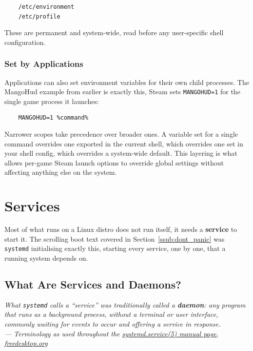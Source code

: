 \documentclass{article}
\newcommand{\code}[1]{\colorbox{codebg}{\texttt{#1}}}
\begin{document}
\begin{verbatim}
	/etc/environment
	/etc/profile
\end{verbatim}

\noindent These are permanent and system-wide, read before any user-specific shell configuration.

\subsubsection{Set by Applications}

Applications can also set environment variables for their own child processes.
The MangoHud example from earlier is exactly this, Steam sets
\code{MANGOHUD=1} for the single game process it launches:

\begin{verbatim}
	MANGOHUD=1 %command%
\end{verbatim}

\begin{tcolorbox}[arc=12pt, outer arc=10pt,
	colback=blue!4!white, colframe=blue!40!black,
	title=\textbf{Scope Overrides}]
	Narrower scopes take precedence over broader ones. A variable set for a single
	command overrides one exported in the current shell, which overrides one set
	in your shell config, which overrides a system-wide default. This layering is
	what allows per-game Steam launch options to override global settings without
	affecting anything else on the system.
\end{tcolorbox}

\newpage
\section{Services}

Most of what runs on a Linux distro does not run itself, it needs a
\textbf{service} to start it. The scrolling boot text covered in
Section~\ref{ssub:dont_panic} was \code{systemd} initialising exactly this,
starting every service, one by one, that a running system depends on.

\subsection{What Are Services and Daemons?}

\begin{mdframed}[linewidth=1.5pt, linecolor=black!50, topline=true, bottomline=true,
	leftline=false, rightline=false, backgroundcolor=black!3]
	\small\itshape
	What \code{systemd} calls a ``service'' was traditionally called a
	\textbf{daemon}: any program that runs as a background process, without a
	terminal or user interface, commonly waiting for events to occur and offering
	a service in response.\\[4pt]
	\normalfont\small ---
	Terminology as used throughout the
	\href{https://www.freedesktop.org/software/systemd/man/latest/systemd.service.html}{systemd.service(5)
		manual page, freedesktop.org}
\end{mdframed}
\end{document}
